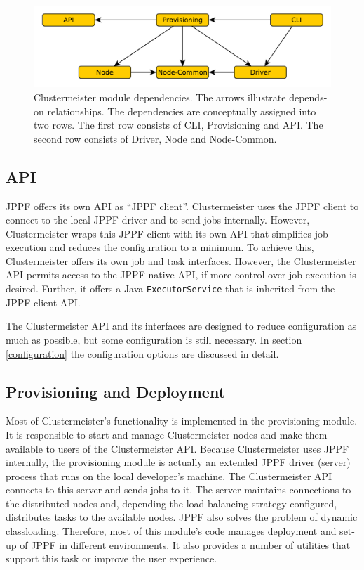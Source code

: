\documentclass[english]{uzhpub}
\begin{document}
\begin{figure}[hp]
\centering
\includegraphics[scale=0.7]{images/module-deps.pdf}
\caption{Clustermeister module dependencies. The arrows illustrate depends-on relationships. The dependencies are conceptually assigned into two rows. The first row consists of CLI, Provisioning and API. The second row consists of Driver, Node and Node-Common.}
\label{fig:deps}
\end{figure}

\subsection{API}

JPPF offers its own API as ``JPPF client''. Clustermeister uses the JPPF client to connect to the local JPPF driver and to send jobs internally. However, Clustermeister wraps this JPPF client with its own API that simplifies job execution and reduces the configuration to a minimum. To achieve this, Clustermeister offers its own job and task interfaces. However, the Clustermeister API permits access to the JPPF native API, if more control over job execution is desired. Further, it offers a Java \texttt{ExecutorService} that is inherited from the JPPF client API.

The Clustermeister API and its interfaces are designed to reduce configuration as much as possible, but some configuration is still necessary. In section \ref{configuration} the configuration options are discussed in detail.

\subsection{Provisioning and Deployment}
Most of Clustermeister's functionality is implemented in the provisioning module. It is responsible to start and manage Clustermeister nodes and make them available to users of the Clustermeister API. Because Clustermeister uses JPPF internally, the provisioning module is actually an extended JPPF driver (server) process that runs on the local developer's machine. The Clustermeister API connects to this server and sends jobs to it. The server maintains connections to the distributed nodes and, depending the load balancing strategy configured, distributes tasks to the available nodes. JPPF also solves the problem of dynamic classloading. Therefore, most of this module's code manages deployment and set-up of JPPF in different environments. It also provides a number of utilities that support this task or improve the user experience.
\end{document}
